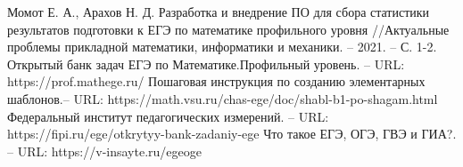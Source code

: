 \begin{thebibliography}{10}
     Момот Е. А., Арахов Н. Д. Разработка и внедрение ПО для сбора статистики результатов подготовки к ЕГЭ по математике профильного уровня //Актуальные проблемы прикладной математики, информатики и механики. – 2021. – С. 1-2.
    Открытый банк задач ЕГЭ по Математике.Профильный уровень. – URL:  https://prof.mathege.ru/
    Пошаговая инструкция по созданию элементарных шаблонов.– URL:  https://math.vsu.ru/chas-ege/doc/shabl-b1-po-shagam.html
    Федеральный институт педагогических измерений. – URL:  https://fipi.ru/ege/otkrytyy-bank-zadaniy-ege
     Что такое ЕГЭ, ОГЭ, ГВЭ и ГИА?. – URL:  https://v-insayte.ru/egeoge
\end{thebibliography}